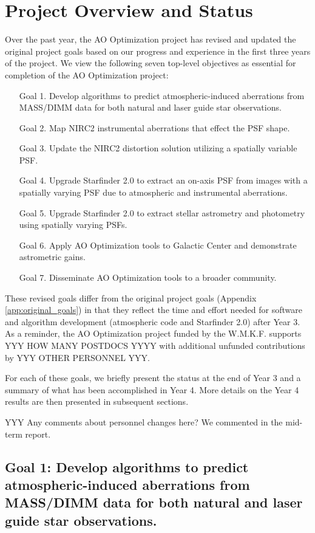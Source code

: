 \section{Project Overview and Status}
\label{sec:overview}

Over the past year, the AO Optimization project has revised and
updated the original project goals based on our progress and
experience in the first three years of the project. We view the
following seven top-level objectives as essential for completion of
the AO Optimization project:
\begin{enumerate}
\item[Goal 1.] Develop algorithms to predict atmospheric-induced aberrations
  from MASS/DIMM data for both natural and laser guide star observations.
\item[Goal 2.] Map NIRC2 instrumental aberrations that effect the PSF shape.
\item[Goal 3.] Update the NIRC2 distortion solution utilizing a spatially
  variable PSF.
\item[Goal 4.] Upgrade Starfinder 2.0 to extract an on-axis PSF from images with
  a spatially varying PSF due to atmospheric and instrumental aberrations.
\item[Goal 5.] Upgrade Starfinder 2.0 to extract stellar astrometry and
  photometry using spatially varying PSFs.
\item[Goal 6.] Apply AO Optimization tools to Galactic Center and demonstrate
  astrometric gains.
\item[Goal 7.] Disseminate AO Optimization tools to a broader community.
\end{enumerate}
These revised goals differ from the original project goals 
(Appendix \ref{app:original_goals}) in that
they reflect the time and effort needed for software and
algorithm development (atmospheric code and Starfinder 2.0) after Year
3. As a reminder, the AO Optimization project funded by the
W.M.K.F. supports YYY HOW MANY POSTDOCS YYYY with additional unfunded 
contributions by YYY OTHER PERSONNEL YYY. 

For each of these goals, we briefly present the status at the end of
Year 3 and a summary of what has been accomplished in Year 4. More
details on the Year 4 results are then presented in subsequent
sections.

YYY Any comments about personnel changes here? We commented in the
mid-term report.



\subsection{Goal 1: Develop algorithms to predict atmospheric-induced aberrations
  from MASS/DIMM data for both natural and laser guide star observations.}

